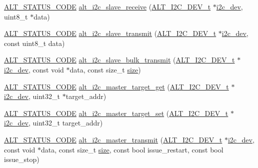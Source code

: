 \begin{DoxyCompactItemize}
\item 
\mbox{\hyperlink{hwlib_8h_abdb0d369f069723ca55d6c94bcaaaa12}{A\+L\+T\+\_\+\+S\+T\+A\+T\+U\+S\+\_\+\+C\+O\+DE}} \mbox{\hyperlink{group__ALT__I2C_gaadba976480855d6b962cd0abbdb01c42}{alt\+\_\+i2c\+\_\+slave\+\_\+receive}} (\mbox{\hyperlink{structALT__I2C__DEV__s}{A\+L\+T\+\_\+\+I2\+C\+\_\+\+D\+E\+V\+\_\+t}} $\ast$\mbox{\hyperlink{structi2c__dev}{i2c\+\_\+dev}}, uint8\+\_\+t $\ast$data)
\item 
\mbox{\hyperlink{hwlib_8h_abdb0d369f069723ca55d6c94bcaaaa12}{A\+L\+T\+\_\+\+S\+T\+A\+T\+U\+S\+\_\+\+C\+O\+DE}} \mbox{\hyperlink{group__ALT__I2C_ga3137e57044cb1f6d1b8ce9b09baf61e3}{alt\+\_\+i2c\+\_\+slave\+\_\+transmit}} (\mbox{\hyperlink{structALT__I2C__DEV__s}{A\+L\+T\+\_\+\+I2\+C\+\_\+\+D\+E\+V\+\_\+t}} $\ast$\mbox{\hyperlink{structi2c__dev}{i2c\+\_\+dev}}, const uint8\+\_\+t data)
\item 
\mbox{\hyperlink{hwlib_8h_abdb0d369f069723ca55d6c94bcaaaa12}{A\+L\+T\+\_\+\+S\+T\+A\+T\+U\+S\+\_\+\+C\+O\+DE}} \mbox{\hyperlink{group__ALT__I2C_ga0328c19c0b8da8349533947b15ae291d}{alt\+\_\+i2c\+\_\+slave\+\_\+bulk\+\_\+transmit}} (\mbox{\hyperlink{structALT__I2C__DEV__s}{A\+L\+T\+\_\+\+I2\+C\+\_\+\+D\+E\+V\+\_\+t}} $\ast$\mbox{\hyperlink{structi2c__dev}{i2c\+\_\+dev}}, const void $\ast$data, const size\+\_\+t \mbox{\hyperlink{sun4u_2tte_8h_a245260f6f74972558f61b85227df5aae}{size}})
\item 
\mbox{\hyperlink{hwlib_8h_abdb0d369f069723ca55d6c94bcaaaa12}{A\+L\+T\+\_\+\+S\+T\+A\+T\+U\+S\+\_\+\+C\+O\+DE}} \mbox{\hyperlink{group__ALT__I2C_gaa24c8832ba8eb5643a4455adfaf48b3c}{alt\+\_\+i2c\+\_\+master\+\_\+target\+\_\+get}} (\mbox{\hyperlink{structALT__I2C__DEV__s}{A\+L\+T\+\_\+\+I2\+C\+\_\+\+D\+E\+V\+\_\+t}} $\ast$\mbox{\hyperlink{structi2c__dev}{i2c\+\_\+dev}}, uint32\+\_\+t $\ast$target\+\_\+addr)
\item 
\mbox{\hyperlink{hwlib_8h_abdb0d369f069723ca55d6c94bcaaaa12}{A\+L\+T\+\_\+\+S\+T\+A\+T\+U\+S\+\_\+\+C\+O\+DE}} \mbox{\hyperlink{group__ALT__I2C_ga9069f423699fb1a1a7ba60ce524a8320}{alt\+\_\+i2c\+\_\+master\+\_\+target\+\_\+set}} (\mbox{\hyperlink{structALT__I2C__DEV__s}{A\+L\+T\+\_\+\+I2\+C\+\_\+\+D\+E\+V\+\_\+t}} $\ast$\mbox{\hyperlink{structi2c__dev}{i2c\+\_\+dev}}, uint32\+\_\+t target\+\_\+addr)
\item 
\mbox{\hyperlink{hwlib_8h_abdb0d369f069723ca55d6c94bcaaaa12}{A\+L\+T\+\_\+\+S\+T\+A\+T\+U\+S\+\_\+\+C\+O\+DE}} \mbox{\hyperlink{group__ALT__I2C_ga1dcffc4f158e9b5c4ddab03f75e1a393}{alt\+\_\+i2c\+\_\+master\+\_\+transmit}} (\mbox{\hyperlink{structALT__I2C__DEV__s}{A\+L\+T\+\_\+\+I2\+C\+\_\+\+D\+E\+V\+\_\+t}} $\ast$\mbox{\hyperlink{structi2c__dev}{i2c\+\_\+dev}}, const void $\ast$data, const size\+\_\+t \mbox{\hyperlink{sun4u_2tte_8h_a245260f6f74972558f61b85227df5aae}{size}}, const bool issue\+\_\+restart, const bool issue\+\_\+stop)

\end{DoxyCompactItemize}
